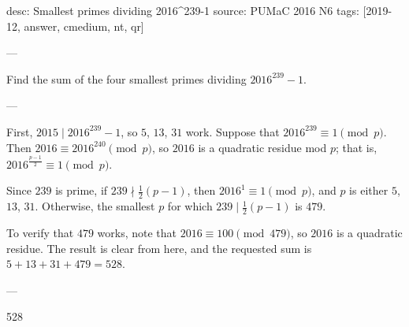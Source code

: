 desc: Smallest primes dividing 2016^239-1
source: PUMaC 2016 N6
tags: [2019-12, answer, cmedium, nt, qr]

---

Find the sum of the four smallest primes dividing $2016^{239}-1$.

---

First, $2015\mid 2016^{239}-1$, so $5$, $13$, $31$ work. Suppose that $2016^{239}\equiv1\pmod p$. Then $2016\equiv2016^{240}\pmod p$, so $2016$ is a quadratic residue mod $p$; that is, $2016^{\frac{p-1}2}\equiv 1\pmod p$.

Since $239$ is prime, if $239\nmid\frac12(p-1)$, then $2016^1\equiv1\pmod p$, and $p$ is either $5$, $13$, $31$. Otherwise, the smallest $p$ for which $239\mid\frac12(p-1)$ is $479$.

To verify that $479$ works, note that $2016\equiv100\pmod{479}$, so $2016$ is a quadratic residue. The result is clear from here, and the requested sum is $5+13+31+479=528$.

---

528
